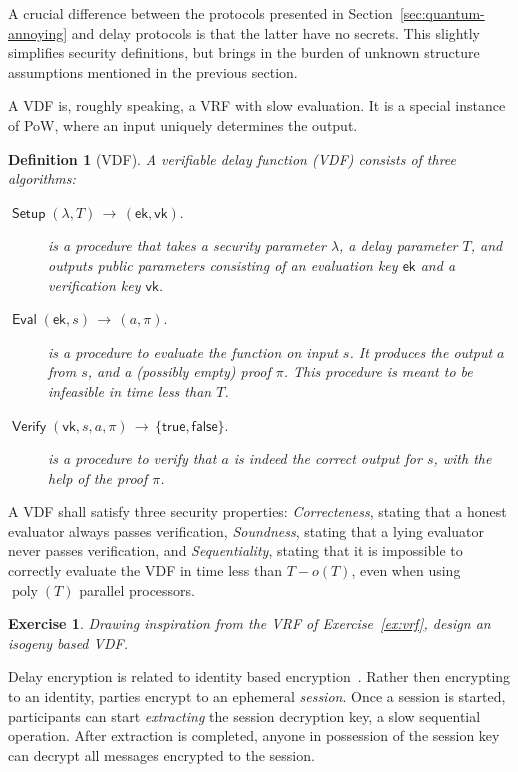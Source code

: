 \documentclass{article}
\newtheorem{ex}{Exercise}
\newtheorem{defi}{Definition}
\newcommand{\ek}{\mathsf{ek}}
\newcommand{\vk}{\mathsf{vk}}
\newcommand{\true}{\mathsf{true}}
\newcommand{\false}{\mathsf{false}}
\DeclareMathOperator{\poly}{poly}
\DeclareMathOperator{\Setup}{\mathsf{Setup}}
\DeclareMathOperator{\Eval}{\mathsf{Eval}}
\DeclareMathOperator{\Verify}{\mathsf{Verify}}
\begin{document}
A crucial difference between the protocols presented in
Section~\ref{sec:quantum-annoying} and delay protocols is that the
latter have no secrets.  This slightly simplifies security
definitions, but brings in the burden of unknown structure assumptions
mentioned in the previous section.

A VDF is, roughly speaking, a VRF with slow evaluation.  It is a
special instance of PoW, where an input uniquely determines the
output.

\begin{defi}[VDF]
  A \emph{verifiable delay function} (VDF) consists of three algorithms:
  \begin{description}
  \item[ $\Setup(\lambda, T)\,\to\,(\ek,\vk)$.] is a procedure that
    takes a security parameter $\lambda$, a delay parameter $T$, and
    outputs public parameters consisting of an evaluation key $\ek$
    and a verification key $\vk$.
  \item[ $\Eval(\ek, s)\,\to\,(a,\pi)$.] is a procedure to evaluate the
    function on input $s$. It produces the output $a$ from $s$, and a
    (possibly empty) proof $\pi$. This procedure is meant to be
    infeasible in time less than $T$.
  \item[ $\Verify(\vk,s,a,\pi)\,\to\,\{\true,\false\}$.] is a procedure
    to verify that $a$ is indeed the correct output for $s$, with the
    help of the proof $\pi$.
  \end{description}
\end{defi}

A VDF shall satisfy three security properties: \emph{Correcteness},
stating that a honest evaluator always passes verification,
\emph{Soundness}, stating that a lying evaluator never passes
verification, and \emph{Sequentiality}, stating that it is impossible
to correctly evaluate the VDF in time less than $T-o(T)$, even when
using $\poly(T)$ parallel processors.

\begin{ex}
  Drawing inspiration from the VRF of Exercise~\ref{ex:vrf}, design an
  isogeny based VDF.
\end{ex}

Delay encryption is related to identity based
encryption~\cite{C:BonFra01}.  Rather then encrypting to an identity,
parties encrypt to an ephemeral \emph{session}.  Once a session is
started, participants can start \emph{extracting} the session
decryption key, a slow sequential operation.  After extraction is
completed, anyone in possession of the session key can decrypt all
messages encrypted to the session.
\end{document}
